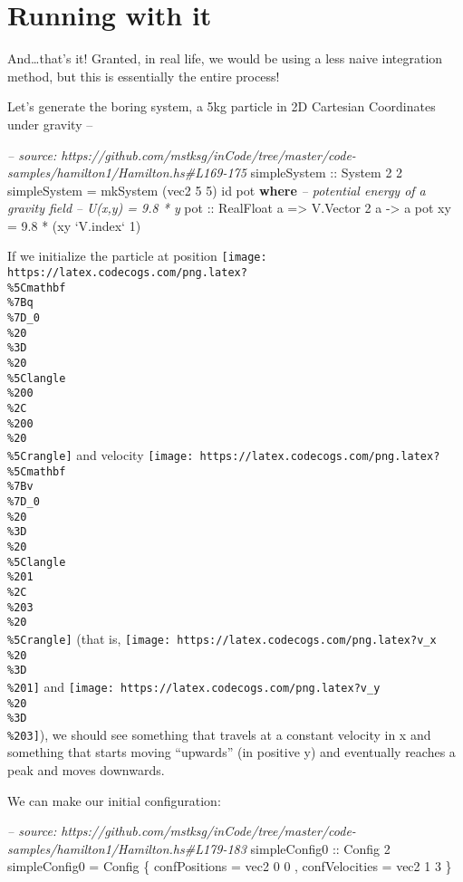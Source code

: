 \documentclass[]{article}
\newenvironment{Shaded}{}{}
\newcommand{\KeywordTok}[1]{\textcolor[rgb]{0.00,0.44,0.13}{\textbf{#1}}}
\newcommand{\DataTypeTok}[1]{\textcolor[rgb]{0.56,0.13,0.00}{#1}}
\newcommand{\DecValTok}[1]{\textcolor[rgb]{0.25,0.63,0.44}{#1}}
\newcommand{\FloatTok}[1]{\textcolor[rgb]{0.25,0.63,0.44}{#1}}
\newcommand{\CommentTok}[1]{\textcolor[rgb]{0.38,0.63,0.69}{\textit{#1}}}
\newcommand{\OtherTok}[1]{\textcolor[rgb]{0.00,0.44,0.13}{#1}}
\newcommand{\FunctionTok}[1]{\textcolor[rgb]{0.02,0.16,0.49}{#1}}
\newcommand{\NormalTok}[1]{#1}
\begin{document}
\section{Running with it}\label{running-with-it}

And\ldots{}that's it! Granted, in real life, we would be using a less naive
integration method, but this is essentially the entire process!

Let's generate the boring system, a 5kg particle in 2D Cartesian Coordinates
under gravity --

\begin{Shaded}
\begin{Highlighting}[]
\CommentTok{-- source: https://github.com/mstksg/inCode/tree/master/code-samples/hamilton1/Hamilton.hs#L169-175}
\OtherTok{simpleSystem ::} \DataTypeTok{System} \DecValTok{2} \DecValTok{2}
\NormalTok{simpleSystem }\FunctionTok{=}\NormalTok{ mkSystem (vec2 }\DecValTok{5} \DecValTok{5}\NormalTok{) id pot}
  \KeywordTok{where}
    \CommentTok{-- potential energy of a gravity field}
    \CommentTok{-- U(x,y) = 9.8 * y}
\OtherTok{    pot ::} \DataTypeTok{RealFloat}\NormalTok{ a }\OtherTok{=>} \DataTypeTok{V.Vector} \DecValTok{2}\NormalTok{ a }\OtherTok{->}\NormalTok{ a}
\NormalTok{    pot xy }\FunctionTok{=} \FloatTok{9.8} \FunctionTok{*}\NormalTok{ (xy }\OtherTok{`V.index`} \DecValTok{1}\NormalTok{)}
\end{Highlighting}
\end{Shaded}

If we initialize the particle at position
\texttt{[image: https://latex.codecogs.com/png.latex?\\\%5Cmathbf\\\%7Bq\\\%7D\_0\\\%20\\\%3D\\\%20\\\%5Clangle\\\%200\\\%2C\\\%200\\\%20\\\%5Crangle]}
and velocity
\texttt{[image: https://latex.codecogs.com/png.latex?\\\%5Cmathbf\\\%7Bv\\\%7D\_0\\\%20\\\%3D\\\%20\\\%5Clangle\\\%201\\\%2C\\\%203\\\%20\\\%5Crangle]}
(that is,
\texttt{[image: https://latex.codecogs.com/png.latex?v\_x\\\%20\\\%3D\\\%201]} and
\texttt{[image: https://latex.codecogs.com/png.latex?v\_y\\\%20\\\%3D\\\%203]}), we
should see something that travels at a constant velocity in x and something that
starts moving ``upwards'' (in positive y) and eventually reaches a peak and
moves downwards.

We can make our initial configuration:

\begin{Shaded}
\begin{Highlighting}[]
\CommentTok{-- source: https://github.com/mstksg/inCode/tree/master/code-samples/hamilton1/Hamilton.hs#L179-183}
\OtherTok{simpleConfig0 ::} \DataTypeTok{Config} \DecValTok{2}
\NormalTok{simpleConfig0 }\FunctionTok{=} \DataTypeTok{Config}
\NormalTok{    \{ confPositions  }\FunctionTok{=}\NormalTok{ vec2 }\DecValTok{0} \DecValTok{0}
\NormalTok{    , confVelocities }\FunctionTok{=}\NormalTok{ vec2 }\DecValTok{1} \DecValTok{3}
\NormalTok{    \}}
\end{Highlighting}
\end{Shaded}
\end{document}
